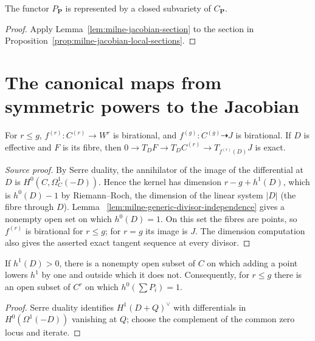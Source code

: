 \begin{corollary}\label{cor:milne-jacobian-local-charts}
The functor $P_{\mathbf P}$ is represented by a closed subvariety of $C_{\mathbf P}$.
\end{corollary}

\begin{proof}
Apply Lemma~\ref{lem:milne-jacobian-section} to the section in Proposition~\ref{prop:milne-jacobian-local-sections}.
\end{proof}


\section{The canonical maps from symmetric powers to the Jacobian}
\begin{theorem}\label{thm:milne-symmetric-to-jacobian}
For $r\le g$, $f^{(r)}:C^{(r)}\to W^r$ is birational, and $f^{(g)}:C^{(g)}\dashrightarrow J$ is birational. If $D$ is effective and $F$ is its fibre, then $0\to T_DF\to T_D C^{(r)}\to T_{f^{(r)}(D)}J$ is exact.
\end{theorem}

\begin{proof}[Source proof]
By Serre duality, the annihilator of the image of the differential at $D$ is
$H^0(C,\Omega_C^1(-D))$.  Hence the kernel has dimension
$r-g+h^1(D)$, which is $h^0(D)-1$ by Riemann--Roch, the dimension of the
linear system $|D|$ (the fibre through $D$).  Lemma~
\ref{lem:milne-generic-divisor-independence} gives a nonempty open set on
which $h^0(D)=1$.  On this set the fibres are points, so $f^{(r)}$ is
birational for $r\le g$; for $r=g$ its image is $J$.  The dimension computation
also gives the asserted exact tangent sequence at every divisor.
\end{proof}

\begin{lemma}\label{lem:milne-generic-divisor-independence}
If $h^1(D)>0$, there is a nonempty open subset of $C$ on which adding a point lowers $h^1$ by one and outside which it does not. Consequently, for $r\le g$ there is an open subset of $C^r$ on which $h^0(\sum P_i)=1$.
\end{lemma}

\begin{proof}
Serre duality identifies $H^1(D+Q)^\vee$ with differentials in $H^0(\Omega^1(-D))$ vanishing at $Q$; choose the complement of the common zero locus and iterate.
\end{proof}

